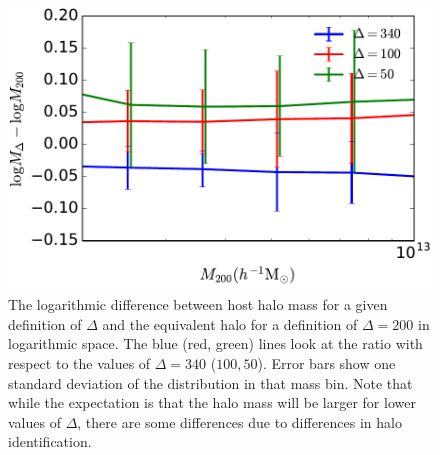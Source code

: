 \documentclass[usenatbib,fleqn]{mnras}
\begin{document}
\begin{figure}
\centering
\includegraphics[width=.5\textwidth]{massdeltacompare.pdf}
\caption{
The logarithmic difference between host halo mass for a given definition of $\Delta$ and the equivalent halo for a definition of $\Delta=200$ in logarithmic space. The blue (red, green) lines look at the ratio with respect to the values of $\Delta=340$ ($100, 50$). Error bars show one standard deviation of the distribution in that mass bin. Note that while the expectation is that the halo mass will be larger for lower values of $\Delta$, there are some differences due to differences in halo identification. 
}
\label{fig:massmatch}
\end{figure}
\end{document}
